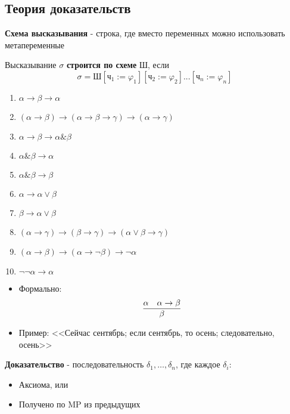 \subsection{Теория доказательств}

\textbf{Схема высказывания} - строка, где вместо переменных можно использовать метапеременные



Высказывание $\sigma$ \textbf{строится по схеме} $\textit{Ш}$, если
$$\sigma = \textit{Ш}[\textit{ч}_1 := \varphi_1][\textit{ч}_2 := \varphi_2]...[\textit{ч}_n := \varphi_n]$$



\begin{enumerate}
\item $\alpha \rightarrow \beta \rightarrow \alpha$
\item $(\alpha \rightarrow \beta) \rightarrow (\alpha \rightarrow \beta \rightarrow \gamma) \rightarrow (\alpha \rightarrow \gamma)$
\item $\alpha \rightarrow \beta \rightarrow \alpha \& \beta$
\item $\alpha \& \beta \rightarrow \alpha$
\item $\alpha \& \beta \rightarrow \beta$
\item $\alpha \rightarrow \alpha \vee \beta$
\item $\beta \rightarrow \alpha \vee \beta$
\item $(\alpha \rightarrow \gamma) \rightarrow (\beta \rightarrow \gamma) \rightarrow (\alpha \vee \beta \rightarrow \gamma)$
\item $(\alpha \rightarrow \beta) \rightarrow (\alpha \rightarrow \neg \beta) \rightarrow \neg \alpha$
\item $\neg \neg \alpha \rightarrow \alpha$
\end{enumerate}


\begin{itemize}
\item Формально: $$\infer{\beta}{\alpha & \alpha\rightarrow\beta}$$
\item Пример: <<Сейчас сентябрь; если сентябрь, то осень; следовательно, осень>>
\end{itemize}

\textbf{Доказательство} - последовательность $\delta_1, \dots, \delta_n$, где каждое $\delta_i$:
\begin{itemize}
\item Аксиома, или
\item Получено по MP из предыдущих
\end{itemize}


